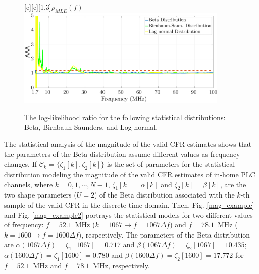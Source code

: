 
\begin{figure}[h!]
	\centering
	[c][1.3]{$\rho_{MLE} (f)$}
	\includegraphics[width=0.9\textwidth]{images/LLH_BETA_BIRN_LogN_1.7.eps}
	\caption{The log-likelihood ratio for the following statistical distributions: Beta, Birnbaun-Saunders, and Log-normal.}
	\label{fig:Log_like}
\end{figure}

The statistical analysis of the magnitude of the valid \ac{CFR} estimates shows that the parameters of the Beta distribution assume different values as frequency changes. If $\mathcal{C}_{k} = \{\zeta_{1}[k],\zeta_{2}[k]\}$ is the set of parameters for the statistical distribution modeling the magnitude of the valid \ac{CFR} estimates of in-home \ac{PLC} channels, where $k=0,1,\cdots,N-1$, $\zeta_{1}[k] = \alpha[k]$ and $\zeta_{2}[k] = \beta[k]$, are the two shape parameters ($U=2$) of the Beta distribution associated with the $k$-th sample of the valid \ac{CFR} in the discrete-time domain. Then, Fig. \ref{mag_example} and Fig. \ref{mag_example2} portrays the statistical models for two different values of frequency: $f=52.1$~MHz ($k=1067 \rightarrow f= 1067\Delta f$) and $f=78.1$~MHz ($k=1600 \rightarrow f = 1600\Delta f$), respectively. The parameters of the Beta distribution are $\alpha(1067 \Delta f) = \zeta_{1}[1067]=0.717$ and $\beta( 1067 \Delta f) = \zeta_{2}[1067] = 10.435$; $\alpha(1600 \Delta f) = \zeta_{1}[1600] = 0.780$ and $\beta( 1600 \Delta f) = \zeta_{2}[1600]=17.772$ for $f=52.1$~MHz and $f=78.1$~MHz, respectively.

